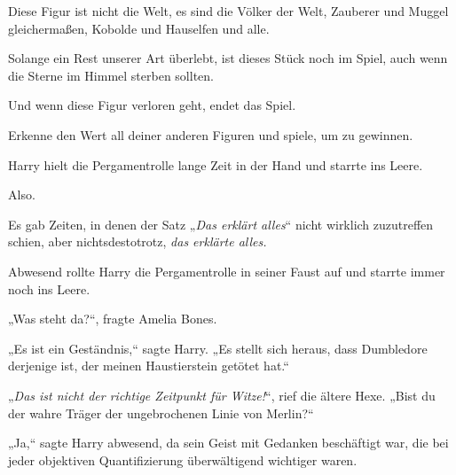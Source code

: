 \begin{writtenNote}
Diese Figur ist nicht die Welt, es sind die Völker der Welt, Zauberer und Muggel gleichermaßen, Kobolde und Hauselfen und alle.

Solange ein Rest unserer Art überlebt, ist dieses Stück noch im Spiel, auch wenn die Sterne im Himmel sterben sollten.

Und wenn diese Figur verloren geht, endet das Spiel.

Erkenne den Wert all deiner anderen Figuren und spiele, um zu gewinnen.

\end{writtenNote}

\later

Harry hielt die Pergamentrolle lange Zeit in der Hand und starrte ins Leere.

Also.

Es gab Zeiten, in denen der Satz „\emph{Das erklärt alles}“ nicht wirklich zuzutreffen schien, aber nichtsdestotrotz, \emph{das erklärte alles.}

Abwesend rollte Harry die Pergamentrolle in seiner Faust auf und starrte immer noch ins Leere.

„Was steht da?“, fragte Amelia Bones.

„Es ist ein Geständnis,“ sagte Harry. „Es stellt sich heraus, dass Dumbledore derjenige ist, der meinen Haustierstein getötet hat.“

„\emph{Das ist nicht der richtige Zeitpunkt für Witze!}“, rief die ältere Hexe. „Bist du der wahre Träger der ungebrochenen Linie von Merlin?“

„Ja,“ sagte Harry abwesend, da sein Geist mit Gedanken beschäftigt war, die bei jeder objektiven Quantifizierung überwältigend wichtiger waren.

